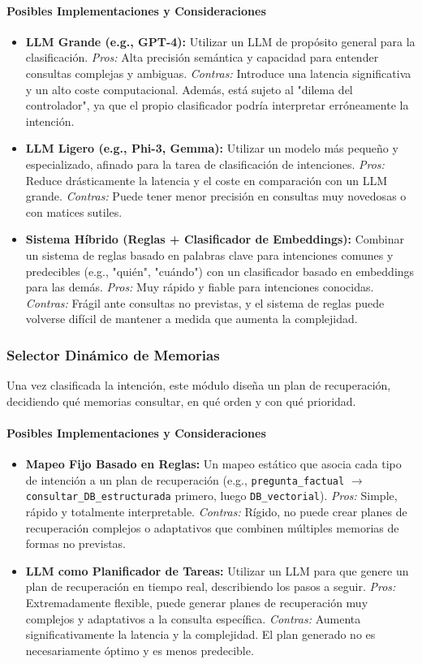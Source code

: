 \documentclass[conference]{IEEEtran}
\begin{document}
\paragraph{Posibles Implementaciones y Consideraciones}
\begin{itemize}
    \item \textbf{LLM Grande (e.g., GPT-4):} Utilizar un LLM de propósito general para la clasificación. \textit{Pros:} Alta precisión semántica y capacidad para entender consultas complejas y ambiguas. \textit{Contras:} Introduce una latencia significativa y un alto coste computacional. Además, está sujeto al "dilema del controlador", ya que el propio clasificador podría interpretar erróneamente la intención.
    \item \textbf{LLM Ligero (e.g., Phi-3, Gemma):} Utilizar un modelo más pequeño y especializado, afinado para la tarea de clasificación de intenciones. \textit{Pros:} Reduce drásticamente la latencia y el coste en comparación con un LLM grande. \textit{Contras:} Puede tener menor precisión en consultas muy novedosas o con matices sutiles.
    \item \textbf{Sistema Híbrido (Reglas + Clasificador de Embeddings):} Combinar un sistema de reglas basado en palabras clave para intenciones comunes y predecibles (e.g., "quién", "cuándo") con un clasificador basado en embeddings para las demás. \textit{Pros:} Muy rápido y fiable para intenciones conocidas. \textit{Contras:} Frágil ante consultas no previstas, y el sistema de reglas puede volverse difícil de mantener a medida que aumenta la complejidad.
\end{itemize}

\subsubsection{Selector Dinámico de Memorias}
Una vez clasificada la intención, este módulo diseña un plan de recuperación, decidiendo qué memorias consultar, en qué orden y con qué prioridad.
\paragraph{Posibles Implementaciones y Consideraciones}
\begin{itemize}
    \item \textbf{Mapeo Fijo Basado en Reglas:} Un mapeo estático que asocia cada tipo de intención a un plan de recuperación (e.g., \texttt{pregunta\_factual} $\rightarrow$ \texttt{consultar\_DB\_estructurada} primero, luego \texttt{DB\_vectorial}). \textit{Pros:} Simple, rápido y totalmente interpretable. \textit{Contras:} Rígido, no puede crear planes de recuperación complejos o adaptativos que combinen múltiples memorias de formas no previstas.
    \item \textbf{LLM como Planificador de Tareas:} Utilizar un LLM para que genere un plan de recuperación en tiempo real, describiendo los pasos a seguir. \textit{Pros:} Extremadamente flexible, puede generar planes de recuperación muy complejos y adaptativos a la consulta específica. \textit{Contras:} Aumenta significativamente la latencia y la complejidad. El plan generado no es necesariamente óptimo y es menos predecible.
\end{itemize}
\end{document}
